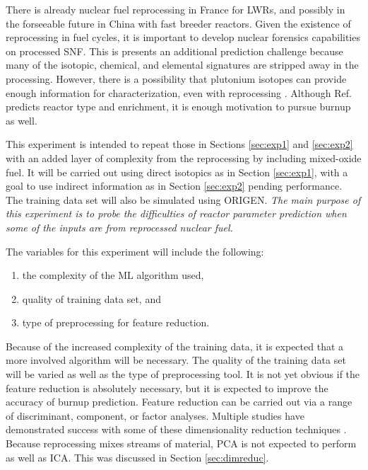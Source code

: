 There is already nuclear fuel reprocessing in France for \gls{LWR}s, and
possibly in the forseeable future in China with fast breeder reactors.  Given
the existence of reprocessing in fuel cycles, it is important to develop
nuclear forensics capabilities on processed \gls{SNF}. This is presents an
additional prediction challenge because many of the isotopic, chemical, and
elemental signatures are stripped away in the processing. However, there is a
possibility that plutonium isotopes can provide enough information for
characterization, even with reprocessing \cite{pu_discrimination}. Although
Ref. \cite{pu_discrimination} predicts reactor type and enrichment, it is
enough motivation to pursue burnup as well. 

This experiment is intended to repeat those in Sections \ref{sec:exp1} and
\ref{sec:exp2} with an added layer of complexity from the reprocessing by
including mixed-oxide fuel.  It will be carried out using direct isotopics as
in Section \ref{sec:exp1}, with a goal to use indirect information as in
Section \ref{sec:exp2} pending performance. The training data set will also be
simulated using \gls{ORIGEN}.  \textit{The main purpose of this experiment is
to probe the difficulties of reactor parameter prediction when some of the
inputs are from reprocessed nuclear fuel.}

The variables for this experiment will include the following:
\begin{enumerate}
  \itemsep-0.75em
  \item the complexity of the \gls{ML} algorithm used,
  \item quality of training data set, and 
  \item type of preprocessing for feature reduction.
\end{enumerate}

Because of the increased complexity of the training data, it is expected that a
more involved algorithm will be necessary.  The quality of the training data
set will be varied as well as the type of preprocessing tool.  It is not yet
obvious if the feature reduction is absolutely necessary, but it is expected to
improve the accuracy of burnup prediction.  Feature reduction can
be carried out via a range of discriminant, component, or factor analyses.
Multiple studies have demonstrated success with some of these dimensionality
reduction techniques \cite{nicolaou_2006, nicolaou_2009, nicolaou_2014,
robel_2009, pu_discrimination, jones_viz_2014, jones_snf_2014}.  Because
reprocessing mixes streams of material, \gls{PCA} is not expected to perform as
well as \gls{ICA}. This was discussed in Section \ref{sec:dimreduc}.

